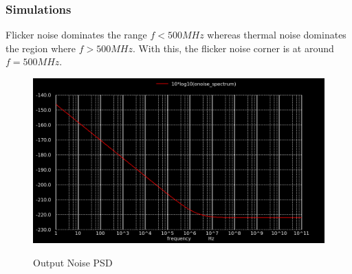 \documentclass[conference]{IEEEtran}
\begin{document}
\subsubsection{Simulations}
Flicker noise dominates the range $f < 500MHz$ whereas thermal noise dominates the region where $f > 500MHz$. With this, the flicker noise corner is at around $f=500MHz$. 
\begin{figure}[H]
	\centering
	\includegraphics[scale=0.24]{noise-spectrum-35.png}
	\label{fig:noise-spectrum-35} 
	\caption{Output Noise PSD}
\end{figure}
\end{document}
